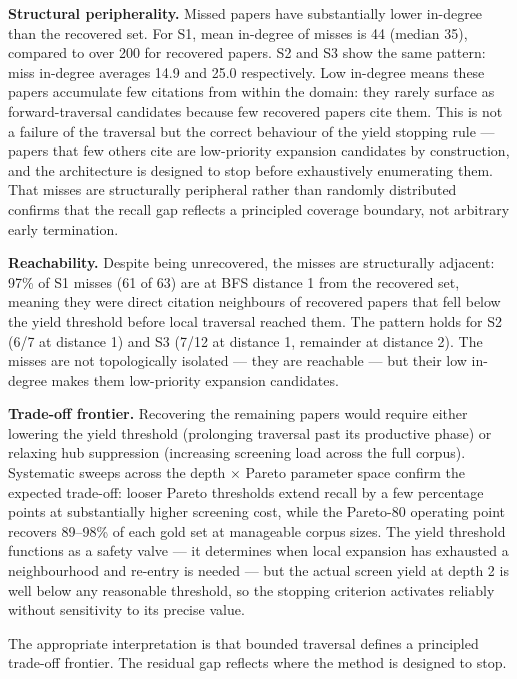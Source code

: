 \documentclass[12pt]{article}
\begin{document}
\textbf{Structural peripherality.} Missed papers have substantially lower in-degree than
the recovered set. For S1, mean in-degree of misses is 44 (median 35), compared to over 200
for recovered papers. S2 and S3 show the same pattern: miss in-degree averages 14.9 and
25.0 respectively. Low in-degree means these papers accumulate few citations from within
the domain: they rarely surface as forward-traversal candidates because few recovered papers
cite them. This is not a failure of the traversal but the correct behaviour of the yield
stopping rule --- papers that few others cite are low-priority expansion candidates by
construction, and the architecture is designed to stop before exhaustively enumerating them.
That misses are structurally peripheral rather than randomly distributed confirms that the
recall gap reflects a principled coverage boundary, not arbitrary early termination.

\textbf{Reachability.} Despite being unrecovered, the misses are structurally adjacent:
97\% of S1 misses (61 of 63) are at BFS distance 1 from the recovered set, meaning they
were direct citation neighbours of recovered papers that fell below the yield threshold
before local traversal reached them. The pattern holds for S2 (6/7 at distance 1) and
S3 (7/12 at distance 1, remainder at distance 2). The misses are not topologically
isolated --- they are reachable --- but their low in-degree makes them low-priority
expansion candidates.

\textbf{Trade-off frontier.} Recovering the remaining papers would require either lowering
the yield threshold (prolonging traversal past its productive phase) or relaxing hub
suppression (increasing screening load across the full corpus). Systematic sweeps across
the depth $\times$ Pareto parameter space confirm the expected trade-off: looser Pareto
thresholds extend recall by a few percentage points at substantially higher screening cost,
while the Pareto-80 operating point recovers 89--98\% of each gold set at manageable
corpus sizes. The yield threshold functions as a safety valve --- it determines when local
expansion has exhausted a neighbourhood and re-entry is needed --- but the actual screen
yield at depth 2 is well below any reasonable threshold, so the stopping criterion
activates reliably without sensitivity to its precise value.

The appropriate interpretation is that bounded traversal defines a principled trade-off
frontier. The residual gap reflects where the method is designed to stop.
\end{document}
